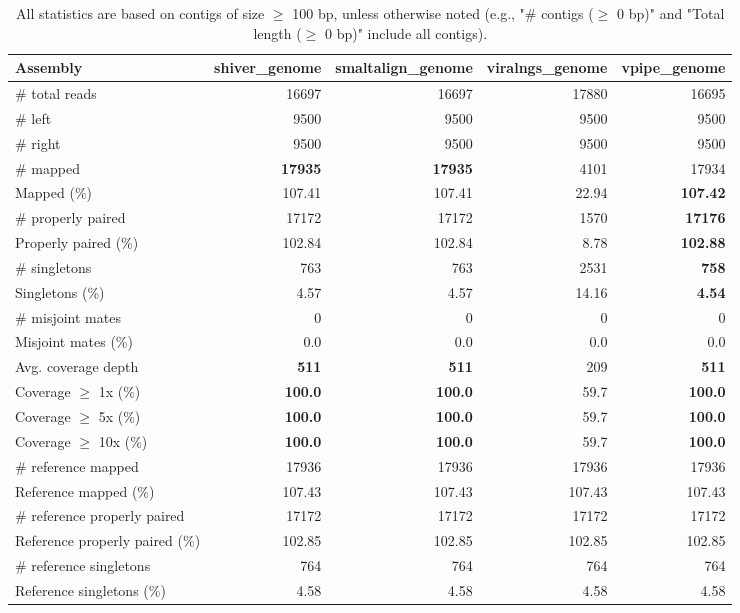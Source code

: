 \documentclass[12pt,a4paper]{article}
\begin{document}
\begin{table}[ht]
\begin{center}
\caption{All statistics are based on contigs of size $\geq$ 100 bp, unless otherwise noted (e.g., "\# contigs ($\geq$ 0 bp)" and "Total length ($\geq$ 0 bp)" include all contigs).}
\begin{tabular}{|l*{4}{|r}|}
\hline
Assembly & shiver\_genome & smaltalign\_genome & viralngs\_genome & vpipe\_genome \\ \hline
\# total reads & 16697 & 16697 & 17880 & 16695 \\ \hline
\# left & 9500 & 9500 & 9500 & 9500 \\ \hline
\# right & 9500 & 9500 & 9500 & 9500 \\ \hline
\# mapped & {\bf 17935} & {\bf 17935} & 4101 & 17934 \\ \hline
Mapped (\%) & 107.41 & 107.41 & 22.94 & {\bf 107.42} \\ \hline
\# properly paired & 17172 & 17172 & 1570 & {\bf 17176} \\ \hline
Properly paired (\%) & 102.84 & 102.84 & 8.78 & {\bf 102.88} \\ \hline
\# singletons & 763 & 763 & 2531 & {\bf 758} \\ \hline
Singletons (\%) & 4.57 & 4.57 & 14.16 & {\bf 4.54} \\ \hline
\# misjoint mates & 0 & 0 & 0 & 0 \\ \hline
Misjoint mates (\%) & 0.0 & 0.0 & 0.0 & 0.0 \\ \hline
Avg. coverage depth & {\bf 511} & {\bf 511} & 209 & {\bf 511} \\ \hline
Coverage $\geq$ 1x (\%) & {\bf 100.0} & {\bf 100.0} & 59.7 & {\bf 100.0} \\ \hline
Coverage $\geq$ 5x (\%) & {\bf 100.0} & {\bf 100.0} & 59.7 & {\bf 100.0} \\ \hline
Coverage $\geq$ 10x (\%) & {\bf 100.0} & {\bf 100.0} & 59.7 & {\bf 100.0} \\ \hline
\# reference mapped & 17936 & 17936 & 17936 & 17936 \\ \hline
Reference mapped (\%) & 107.43 & 107.43 & 107.43 & 107.43 \\ \hline
\# reference properly paired & 17172 & 17172 & 17172 & 17172 \\ \hline
Reference properly paired (\%) & 102.85 & 102.85 & 102.85 & 102.85 \\ \hline
\# reference singletons & 764 & 764 & 764 & 764 \\ \hline
Reference singletons (\%) & 4.58 & 4.58 & 4.58 & 4.58 \\ \hline

\end{tabular}
\end{center}
\end{table}
\end{document}
